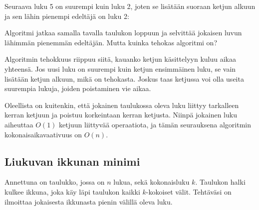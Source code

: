 Seuraava luku 5 on suurempi kuin luku 2,
joten se lisätään suoraan ketjun alkuun ja
sen lähin pienempi edeltäjä on luku 2:

\begin{center}
\end{center}

Algoritmi jatkaa samalla tavalla taulukon loppuun
ja selvittää jokaisen luvun lähimmän
pienemmän edeltäjän.
Mutta kuinka tehokas algoritmi on?

Algoritmin tehokkuus riippuu siitä,
kauanko ketjun käsittelyyn kuluu aikaa yhteensä.
Jos uusi luku on suurempi kuin ketjun ensimmäinen
luku, se vain lisätään ketjun alkuun,
mikä on tehokasta.
Joskus taas ketjussa voi olla useita
suurempia lukuja, joiden poistaminen vie aikaa.

Oleellista on kuitenkin, että jokainen
taulukossa oleva luku liittyy
tarkalleen kerran ketjuun ja poistuu
korkeintaan kerran ketjusta.
Niinpä jokainen luku aiheuttaa $O(1)$
ketjuun liittyvää operaatiota, ja tämän
seurauksena algoritmin kokonaisaikavaativuus on $O(n)$.


\subsection{Liukuvan ikkunan minimi}


\begin{task}
Annettuna on taulukko, jossa on $n$ lukua,
sekä kokonaisluku $k$.
Taulukon halki kulkee ikkuna, joka käy
läpi taulukon kaikki $k$-kokoiset välit.
Tehtäväsi on ilmoittaa jokaisesta ikkunasta
pienin välillä oleva luku.
\end{task}

